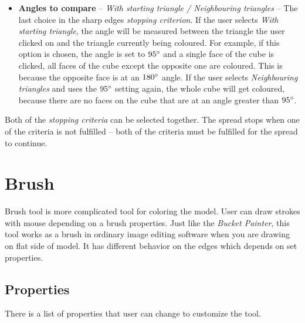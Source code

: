 \begin{itemize}
\item \textbf{Angles to compare} -- \textit{With starting triangle / Neighbouring triangles} -- The last choice in the sharp edges \textit{stopping criterion}. If the user selects \textit{With starting triangle}, the angle will be measured between the triangle the user clicked on and the triangle currently being coloured. For example, if this option is chosen, the angle is set to $95\degree$ and a single face of the cube is clicked, all faces of the cube except the opposite one are coloured. This is because the opposite face is at an $180\degree$ angle. If the user selects \textit{Neighbouring triangles} and uses the $95\degree$ setting again, the whole cube will get coloured, because there are no faces on the cube that are at an angle greater than $95\degree$.

\end{itemize}

Both of the \textit{stopping criteria} can be selected together. The spread stops when one of the criteria is not fulfilled -- both of the criteria must be fulfilled for the spread to continue.

\section{Brush}

Brush tool is more complicated tool for coloring the model. User can draw strokes with mouse depending on a brush properties. Just like the \textit{Bucket Painter}, this tool works as a brush in ordinary image editing software when you are drawing on flat side of model. It has different behavior on the edges which depends on set properties.

\subsection{Properties}

There is a list of properties that user can change to customize the tool.


